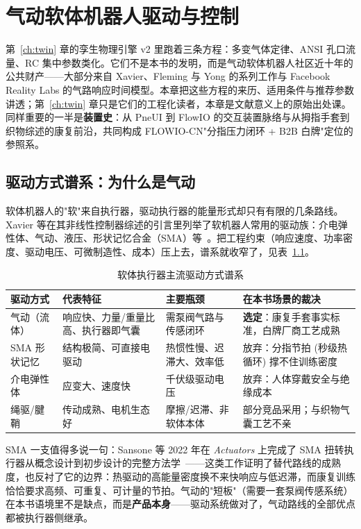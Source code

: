 \chapter{气动软体机器人驱动与控制}
\label{ch:pneu-theory}

第~\ref{ch:twin} 章的孪生物理引擎 v2 里跑着三条方程：多变气体定律、ANSI 孔口流量、RC 集中参数类化。它们不是本书的发明，而是气动软体机器人社区近十年的公共财产——大部分来自 Xavier、Fleming 与 Yong 的系列工作与 Facebook Reality Labs 的气路响应时间模型。本章把这些方程的来历、适用条件与推荐参数讲透；第~\ref{ch:twin} 章只是它们的工程化读者，本章是文献意义上的原始出处课。同样重要的一半是\textbf{装置史}：从 PneUI 到 FlowIO 的交互装置脉络与从拇指手套到织物综述的康复前沿，共同构成 FLOWIO-CN"分指压力闭环 + B2B 白牌"定位的参照系。

\section{驱动方式谱系：为什么是气动}
\label{sec:pneu-actuation}

软体机器人的"软"来自执行器，驱动执行器的能量形式却只有有限的几条路线。Xavier 等在其非线性控制器综述的引言里列举了软机器人常用的驱动族：介电弹性体、气动、液压、形状记忆合金（SMA）等~\cite{Xavier2022Frontiers}。把工程约束（响应速度、功率密度、驱动电压、可微制造性、成本）压上去，谱系就收窄了，见表~\ref{tab:pneu-spectrum}。

\begin{table}[htbp]
  \centering
  \caption{软体执行器主流驱动方式谱系}
  \label{tab:pneu-spectrum}
  \begin{tabular}{lp{2.6cm}p{2.4cm}p{3.6cm}}
    \toprule
    驱动方式 & 代表特征 & 主要瓶颈 & 在本书场景的裁决 \\
    \midrule
    气动（流体） & 响应快、力量/重量比高、执行器即气囊 & 需泵阀气路与传感闭环 & \textbf{选定}：康复手套事实标准，白牌厂商工艺成熟 \\
    SMA 形状记忆 & 结构极简、可直接电驱动~\cite{Sansone2022} & 热惯性慢、迟滞大、效率低 & 放弃：分指节拍 (秒级热循环) 撑不住训练密度 \\
    介电弹性体 & 应变大、速度快 & 千伏级驱动电压 & 放弃：人体穿戴安全与绝缘成本 \\
    绳驱/腱鞘 & 传动成熟、电机生态好 & 摩擦/迟滞、非软体本体 & 部分竞品采用；与织物气囊工艺不亲 \\
    \bottomrule
  \end{tabular}
\end{table}

SMA 一支值得多说一句：Sansone 等 2022 年在 \emph{Actuators} 上完成了 SMA 扭转执行器从概念设计到初步设计的完整方法学~\cite{Sansone2022}——这类工作证明了替代路线的成熟度，也反衬了它的边界：热驱动的高能量密度换不来快响应与低迟滞，而康复训练恰恰要求高频、可重复、可计量的节拍。气动的"短板"（需要一套泵阀传感系统）在本书语境里不是缺点，而是\textbf{产品本身}——驱动系统做对了，气动路线的全部优点都被执行器侧继承。

